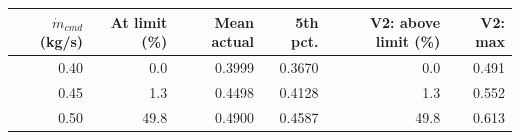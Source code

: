 \begin{tabular}{rrrrrr}
\toprule
$\dot m_{cmd}$ (kg/s) & At limit (\%) & Mean actual & 5th pct. & V2: above limit (\%) & V2: max \\
\midrule
0.40 & 0.0 & 0.3999 & 0.3670 & 0.0 & 0.491 \\
0.45 & 1.3 & 0.4498 & 0.4128 & 1.3 & 0.552 \\
0.50 & 49.8 & 0.4900 & 0.4587 & 49.8 & 0.613 \\
\bottomrule
\end{tabular}
